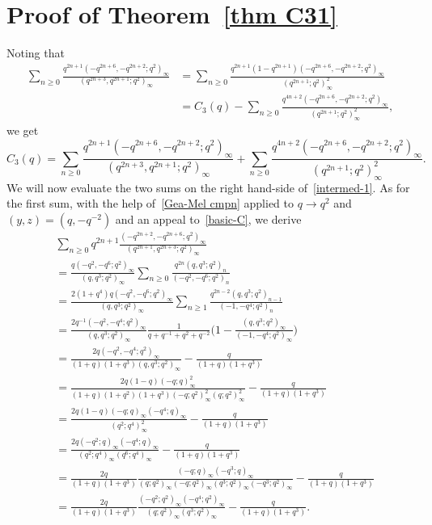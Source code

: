 \documentclass[reqno]{amsart}
\theoremstyle{definition}
\theoremstyle{plain}
\theoremstyle{remark}
\numberwithin{equation}{section}
\newcommand{\fr}{\frac}
\begin{document}
\section{Proof of Theorem~\ref{thm C31}}\label{sec proof C31}
Noting that
\begin{align*}
\sum_{n\geq 0}\fr{q^{2n+1}(-q^{2n+6},-q^{2n+2};q^2)_\infty}{(q^{2n+3},q^{2n+1};q^2)_\infty}
&= \sum_{n\geq 0}\fr{q^{2n+1}(1-q^{2n+1}) (-q^{2n+6},-q^{2n+2};q^2)_\infty}{(q^{2n+1};q^2)_\infty^2} \\
&=C_{3}(q) -\sum_{n\geq 0}\fr{q^{4n+2}(-q^{2n+6},-q^{2n+2};q^2)_\infty}{(q^{2n+1};q^2)_\infty^2},
\end{align*}
we get
\begin{equation}\label{intermed-1}
C_{3}(q)
=\sum_{n\geq 0}\fr{q^{2n+1}(-q^{2n+6},-q^{2n+2};q^2)_\infty}{(q^{2n+3},q^{2n+1};q^2)_\infty}
+\sum_{n\geq 0}\fr{q^{4n+2}(-q^{2n+6},-q^{2n+2};q^2)_\infty}{(q^{2n+1};q^2)_\infty^2}.
\end{equation}
We will now evaluate the two sums on the right hand-side of~\eqref{intermed-1}.
As for the first sum, with the help of~\eqref{Gea-Mel cmpn} applied to $q\to q^2$ and $(y,z)=(q,-q^{-2})$ and an appeal to~\eqref{basic-C}, we derive
\begin{align}
&
\sum_{n\geq 0} q^{2n+1} \fr{(-q^{2n+2},-q^{2n+6};q^2)_\infty}{(q^{2n+1},q^{2n+3};q^2)_\infty} \nonumber \\
&=\fr{q(-q^2,-q^6;q^2)_\infty}{(q,q^3;q^2)_\infty}\sum_{n\geq 0}\fr{q^{2n} (q,q^3;q^2)_n}{(-q^2,-q^6;q^2)_n} \nonumber \\
&=\fr{2(1+q^4)q(-q^2,-q^6;q^2)_\infty}{(q,q^3;q^2)_\infty} \sum_{n\geq 1}\fr{q^{2n-2} (q,q^3;q^2)_{n-1}}{(-1,-q^4;q^2)_n} \nonumber \\
&=\fr{2q^{-1}(-q^2,-q^4;q^2)_\infty}{(q,q^3;q^2)_\infty} \fr{1}{q+q^{-1}+q^2+q^{-2}}\Big(1-\fr{(q,q^3;q^2)_\infty}{(-1,-q^4;q^2)_\infty} \Big)
\nonumber \\
&=\fr{2q(-q^2,-q^4;q^2)_\infty}{(1+q)(1+q^3)(q,q^3;q^2)_\infty} -\fr{q}{(1+q)(1+q^3)} \nonumber \\
&=\fr{2q(1-q) (-q;q)_\infty^2}{(1+q)(1+q^2)(1+q^3)(-q;q^2)_\infty^2 (q;q^2)_\infty^2} -\fr{q}{(1+q)(1+q^3)} \nonumber \\
&=\fr{2q (1-q)(-q;q)_\infty (-q^4;q)_\infty}{(q^2;q^4)_\infty^2}  -\fr{q}{(1+q)(1+q^3)} \\
&=\fr{2q(-q^2;q)_\infty (-q^4;q)_\infty}{(q^2;q^4)_\infty (q^6;q^4)_\infty}-\fr{q}{(1+q)(1+q^3)} \\
&=\fr{2q}{(1+q)(1+q^3)}\fr{(-q;q)_\infty (-q^3;q)_\infty}{(q;q^2)_\infty (-q;q^2)_\infty(q^3;q^2)_\infty(-q^3;q^2)_\infty}-\fr{q}{(1+q)(1+q^3)}
\nonumber \\
&=\fr{2q}{(1+q)(1+q^3)}\fr{(-q^2;q^2)_\infty (-q^4;q^2)_\infty}{(q;q^2)_\infty(q^3;q^2)_\infty}-\fr{q}{(1+q)(1+q^3)} \label{intermed-2}.
\end{align}
\end{document}

